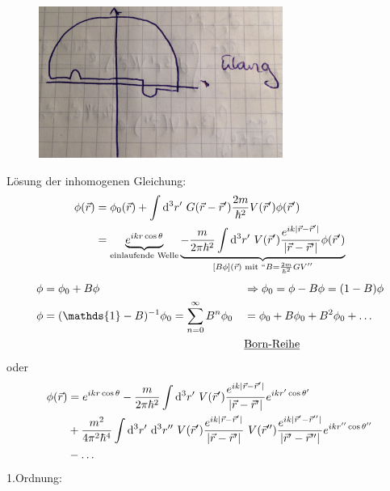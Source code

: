 	\begin{figure} [h]
		\begin{center}
			\includegraphics[width=8cm]{Born_Naeherung}
		\end{center}
	\end{figure}
	Lösung der inhomogenen Gleichung:
		\begin{align*}
			\phi(\vec{r}) &= \phi_0 (\vec{r}) + 
			\int \diff^3 r' ~G(\vec{r} - \vec{r}') \frac{2m}{\hbar^2} V(\vec{r}') \phi (\vec{r}') \\
			&= \underbrace{e^{ikr \cos \theta}}_{\substack{\text{einlaufende Welle}}}
			\underbrace{- \frac{m}{2 \pi \hbar^2} \int \diff^3 r' ~V(\vec{r}') 
			\frac{e^{ik |\vec{r} - \vec{r}'|}}{|\vec{r} - \vec{r}'|} \phi (\vec{r}')}_{\mathclap{[
				B\phi] (\vec{r}) \text{ mit } ``B=\frac{2m}{\hbar^2} GV''}} 
		\end{align*}
		\begin{align*}
			\phi &= \phi_0 + B \phi &
			&\Rightarrow \phi_0 = \phi - B \phi = (1 - B) \phi \\
			\phi &= (\mathds{1} - B)^{-1} \phi_0 = \sum_{n = 0}^{\infty} B^n \phi_0 &
			&= \phi_0 + B \phi_0 + B^2 \phi_0 + \ldots \\
			& & &\text{\underline{Born-Reihe}}
		\end{align*}
	oder
		\begin{align*}
			\phi (\vec{r}) &= e^{ikr \cos \theta}
			- \frac{m}{2 \pi \hbar^2} \int \mathrm{d}^3 r' ~V(\vec{r}') 
			\frac{e^{ik |\vec{r} - \vec{r}'|}}{|\vec{r} - \vec{r}'|}
			e^{ikr' \cos \theta'} \\
			&+ \frac{m^2}{4 \pi^2 \hbar^4} \int \mathrm{d}^3 r' ~\mathrm{d}^3 r'' 
			~V(\vec{r}') 
			\frac{e^{ik |\vec{r} - \vec{r}'|}}{|\vec{r} - \vec{r}'|}
			~V(\vec{r}'') 
			\frac{e^{ik |\vec{r}' - \vec{r}''|}}{|\vec{r}' - \vec{r}''|}
			e^{ikr'' \cos \theta''} \\
			&- \ldots
		\end{align*}
	1.Ordnung:
